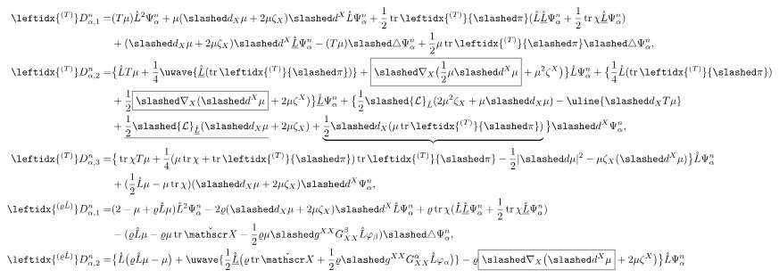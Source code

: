 \documentclass[11pt,twoside]{article}
\def\al{\alpha}
\def\vp{\varphi}
\def \no{\nonumber}
\def\f{\frac}
\begin{document}
\begin{align}
\leftidx{^{(T)}}D_{\al,1}^{n}=&(T\mu)\mathring L^2\Psi_\al^n+\mu(\slashed d_X\mu+2\mu\zeta_X)\slashed d^X\mathring L\Psi_\al^n+\f12\operatorname{tr}\leftidx{^{(T)}}{\slashed\pi}(\mathring L\mathring{\underline L}\Psi_\al^n+\f12\operatorname{tr}\chi\mathring{\underline L}\Psi_\al^n)\no\\
&+(\slashed d_X\mu+2\mu\zeta_X)\slashed d^X\mathring{\underline L}\Psi_\al^n-(T\mu)\slashed\triangle\Psi_\al^n
+\f12\mu\operatorname{tr}\leftidx{^{(T)}}{\slashed\pi}\slashed\triangle\Psi_\al^n,\label{T1}\\
\leftidx{^{(T)}}D_{\al,2}^{n}=&\big\{\mathring L T\mu+\f14\uwave{\mathring{\underline L}(\operatorname{tr}\leftidx{^{(T)}}{\slashed\pi})}+\boxed{\slashed\nabla_X\big(\f12\mu\slashed d^X\mu}+\mu^2\zeta^X\big)\big\}\mathring L\Psi_\al^n+\big\{\f14\mathring L(\operatorname{tr}\leftidx{^{(T)}}{\slashed\pi})\no\\
&+\f12\boxed{\slashed\nabla_X(\slashed d^X\mu}+2\mu\zeta^X)\big\}\mathring{\underline L}\Psi_\al^n+\big\{\f12\slashed{\mathcal L}_{\mathring L}(2\mu^2\zeta_X+\mu\slashed d_X\mu)-\uline{\slashed d_XT\mu}\no\\
&+\underline{\f12\slashed{\mathcal L}_{\mathring{\underline L}}(\slashed d_X\mu}+2\mu\zeta_X)+\underbrace{\f12\slashed d_X(\mu\operatorname{tr}\leftidx{^{(T)}}{\slashed\pi})}\big\}\slashed d^X\Psi_\al^n,\label{T2}\\
\leftidx{^{(T)}}D_{\al,3}^{n}=&\big\{\operatorname{tr}\chi T\mu+\f14(\mu\operatorname{tr}\chi+\operatorname{tr}\leftidx{^{(T)}}{\slashed \pi})\operatorname{tr}\leftidx{^{(T)}}{\slashed \pi}-\f12|\slashed d\mu|^2-\mu\zeta_X(\slashed d^X\mu)\big\}\mathring L\Psi_\al^n\no\\
&+(\f12\mathring L\mu-\mu\operatorname{tr}\chi)(\slashed d_X\mu+2\mu\zeta_X)\slashed d^X\Psi_\al^n,\label{T3}\\
\leftidx{^{(\varrho\mathring L)}}D_{\al,1}^{n}=&(2-\mu+\varrho\mathring L\mu)\mathring L^2\Psi_\al^n-2\varrho(\slashed d_X\mu+2\mu\zeta_X)\slashed d^X\mathring L\Psi_\al^n+\varrho\operatorname{tr}\chi(\mathring L\mathring{\underline L}\Psi_\al^n+\f12\operatorname{tr}\chi\mathring{\underline L}\Psi_\al^n)\no\\
&-(\varrho\mathring L\mu-\varrho\mu\operatorname{tr}{\check{\mathscr X}}-\f12\varrho\mu\slashed g^{XX}G_{XX}^\beta\mathring L\vp_\beta)\slashed\triangle\Psi_\al^n,\label{rL1}\\
\leftidx{^{(\varrho\mathring L)}}D_{\al,2}^{n}=&\big\{\mathring L\big(\varrho\mathring L\mu-\mu\big)+\uwave{\f12\mathring{\underline L}\big(\varrho\operatorname{tr}\check{\mathscr X}+\f12\varrho\slashed g^{XX}G_{XX}^\al\mathring L\vp_\al\big)}-\varrho\boxed{\slashed\nabla_X\big(\slashed d^X\mu}+2\mu\zeta^X\big)\big\}\mathring L\Psi_\al^n\no\\

\end{align}
\end{document}
